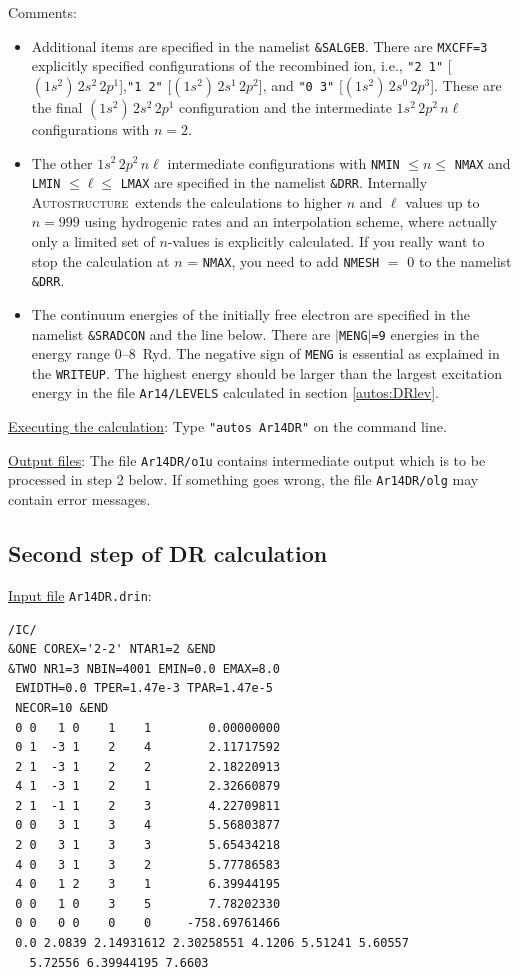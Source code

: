 \documentclass[a4paper,12pt]{article}
\newcommand{\autos}{\textsc{Autostructure}}
\begin{document}
Comments:
\begin{itemize}
\item Additional items are specified in the namelist \texttt{\&SALGEB}. There are \texttt{MXCFF=3} explicitly specified configurations of the recombined ion, i.e., \texttt{"2 1"} [$(1s^2)\,2s^2\,2p^1$],\newline  \texttt{"1 2"} [$(1s^2)\,2s^1\,2p^2$], and  \texttt{"0 3"} [$(1s^2)\,2s^0\,2p^3$]. These are the final $(1s^2)\,2s^2\,2p^1$ configuration and the intermediate $1s^2\,2p^2\,n\ell$ configurations with $n=2$.
\item The other $1s^2\,2p^2\,n\ell$ intermediate configurations with \texttt{NMIN} $\leq n \leq$ \texttt{NMAX} and \texttt{LMIN} $\leq \ell \leq$ \texttt{LMAX} are specified in the namelist \texttt{\&DRR}. Internally \autos\ extends the calculations to higher $n$ and $\ell$ values up to $n=999$ using hydrogenic rates and an interpolation scheme, where actually only a limited set of $n$-values is explicitly calculated. If you really want to stop the calculation at $n$ = \texttt{NMAX}, you need to add \texttt{NMESH} $=$ 0 to the namelist \texttt{\&DRR}.
\item The continuum energies of the initially free electron are specified in the namelist \texttt{\&SRADCON} and the line below. There are \texttt{$\vert$MENG$\vert$=9} energies in the energy range 0--8~Ryd. The negative sign of \texttt{MENG} is essential as explained in the \texttt{WRITEUP}. The highest energy should be larger than the largest excitation energy in the file \texttt{Ar14/LEVELS} calculated in section \ref{autos:DRlev}.
\end{itemize}

\underline{Executing the calculation}: Type \texttt{"autos Ar14DR"} on the command line.

\underline{Output files}: The file \texttt{Ar14DR/o1u} contains intermediate output which is to be processed in step 2 below. If something goes wrong, the file \texttt{Ar14DR/olg} may contain error messages.

\subsection{Second step of DR calculation}\label{autos:DRstep2}

\underline{Input file} \texttt{Ar14DR.drin}:
\begin{verbatim}
/IC/
&ONE COREX='2-2' NTAR1=2 &END
&TWO NR1=3 NBIN=4001 EMIN=0.0 EMAX=8.0
 EWIDTH=0.0 TPER=1.47e-3 TPAR=1.47e-5
 NECOR=10 &END
 0 0   1 0    1    1        0.00000000
 0 1  -3 1    2    4        2.11717592
 2 1  -3 1    2    2        2.18220913
 4 1  -3 1    2    1        2.32660879
 2 1  -1 1    2    3        4.22709811
 0 0   3 1    3    4        5.56803877
 2 0   3 1    3    3        5.65434218
 4 0   3 1    3    2        5.77786583
 4 0   1 2    3    1        6.39944195
 0 0   1 0    3    5        7.78202330
 0 0   0 0    0    0     -758.69761466
 0.0 2.0839 2.14931612 2.30258551 4.1206 5.51241 5.60557
   5.72556 6.39944195 7.6603
\end{verbatim}
\end{document}
